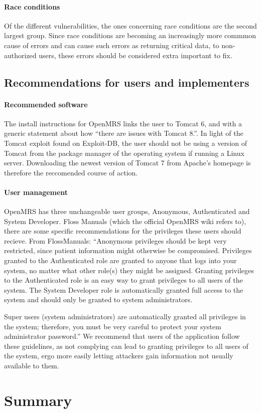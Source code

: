 \documentclass{report} %
\begin{document}
\paragraph{Race conditions}
Of the different vulnerabilities, the ones concerning race conditions are 
the second largest group. Since race conditions are becoming an increasingly
more commmon cause of errors and can cause such errors as returning critical
data, to non-authorized users, these errors should be considered extra important
to fix.

\subsection{Recommendations for users and implementers}
\paragraph{Recommended software}
The install instructions for OpenMRS links the user to Tomcat 6, and with a
generic statement about how ``there are issues with Tomcat 8.''. In light of the
Tomcat exploit found on Exploit-DB, the user should not be using a version of Tomcat
from the package manager of the operating system if running a Linux server.
Downloading the newest version of Tomcat 7 from Apache's homepage is therefore
the reccomended course of action.

\paragraph{User management}
OpenMRS has three unchangeable user groups, Anonymous, Authenticated and System
Developer. Floss Manuals (which the official OpenMRS wiki refers to), there are
some specific recommendations for the privileges these users should recieve.
From FlossManuals: ``Anonymous privileges should be kept very restricted, since patient
information might otherwise be compromised. Privileges granted to the
Authenticated role are granted to anyone that logs into your system, no matter
what other role(s) they might be assigned. Granting privileges to the
Authenticated role is an easy way to grant privileges to all users of the
system. The System Developer role is automatically granted full access to the
system and should only be granted to system administrators.

Super users (system administrators) are automatically granted all privileges
in the system; therefore, you must be very careful to protect your system
administrator password.'' \autocite[]{FLOSS}
We recommend that users of the application follow these guidelines, as not
complying can lead to granting privileges to all users of the system, ergo more
easily letting attackers gain information not usually available to them.

\autocite[]{FLOSS}

\section{Summary}
\end{document}
